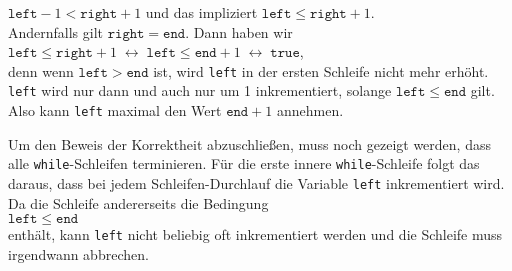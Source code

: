 \begin{enumerate}
      \hspace*{1.3cm} $\mathtt{left} - 1 < \mathtt{right} + 1$ \quad und das impliziert \quad $\mathtt{left} \leq \mathtt{right} + 1$. 
      \\[0.2cm]
      Andernfalls gilt $\texttt{right}=\mathtt{end}$.  Dann haben wir 
      \\[0.2cm]
      \hspace*{1.3cm}
      $\mathtt{left} \leq \mathtt{right} + 1 \;\leftrightarrow\;
       \mathtt{left} \leq \mathtt{end} + 1 \;\leftrightarrow\; \mathtt{true}$,
      \\[0.2cm]
      denn wenn $\texttt{left} > \mathtt{end}$ ist, wird \texttt{left} in der ersten
      Schleife nicht mehr erh\"oht.  \texttt{left} wird nur dann und auch nur um 1
      inkrementiert, solange $\texttt{left} \leq \mathtt{end}$ gilt.
      Also kann \texttt{left} maximal den Wert $\texttt{end} + 1$ annehmen.
\end{enumerate}
Um den Beweis der Korrektheit abzuschlie{\ss}en, muss noch gezeigt werden, dass 
alle \texttt{while}-Schleifen terminieren.  F\"ur die erste innere
\texttt{while}-Schleife folgt das daraus, dass bei jedem Schleifen-Durchlauf die Variable
\texttt{left} inkrementiert wird.  Da die Schleife andererseits die Bedingung \\[0.2cm]
\hspace*{1.3cm} $\texttt{left} \leq \mathtt{end}$ \\[0.2cm]
enth\"alt, kann \texttt{left} nicht beliebig oft inkrementiert werden und die Schleife muss
irgendwann abbrechen. 

